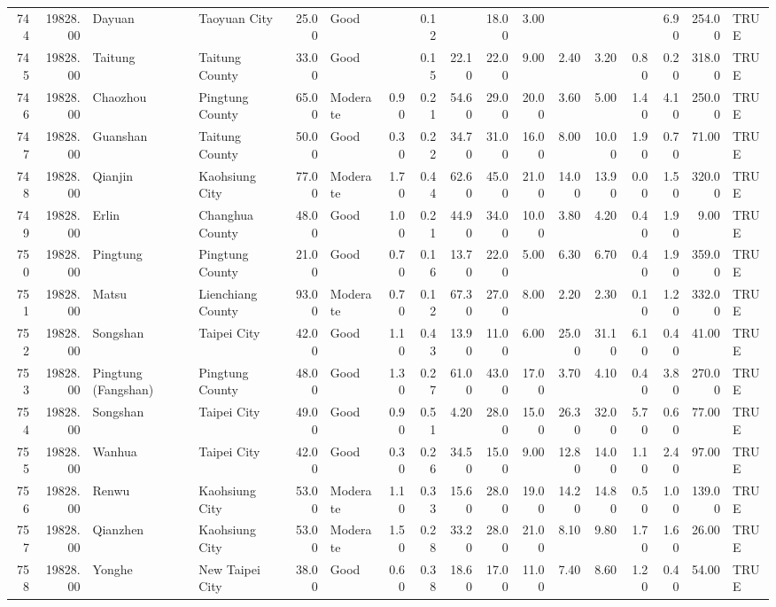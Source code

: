 \begin{table}[ht]
\begin{tabular}{rrllrlrrrrrrrrrrl}
  744 & 19828.00 & Dayuan & Taoyuan City & 25.00 & Good &  & 0.12 &  & 18.00 & 3.00 &  &  &  & 6.90 & 254.00 & TRUE \\ 
  745 & 19828.00 & Taitung & Taitung County & 33.00 & Good &  & 0.15 & 22.10 & 22.00 & 9.00 & 2.40 & 3.20 & 0.80 & 0.20 & 318.00 & TRUE \\ 
  746 & 19828.00 & Chaozhou & Pingtung County & 65.00 & Moderate & 0.90 & 0.21 & 54.60 & 29.00 & 20.00 & 3.60 & 5.00 & 1.40 & 4.10 & 250.00 & TRUE \\ 
  747 & 19828.00 & Guanshan & Taitung County & 50.00 & Good & 0.30 & 0.22 & 34.70 & 31.00 & 16.00 & 8.00 & 10.00 & 1.90 & 0.70 & 71.00 & TRUE \\ 
  748 & 19828.00 & Qianjin & Kaohsiung City & 77.00 & Moderate & 1.70 & 0.44 & 62.60 & 45.00 & 21.00 & 14.00 & 13.90 & 0.00 & 1.50 & 320.00 & TRUE \\ 
  749 & 19828.00 & Erlin & Changhua County & 48.00 & Good & 1.00 & 0.21 & 44.90 & 34.00 & 10.00 & 3.80 & 4.20 & 0.40 & 1.90 & 9.00 & TRUE \\ 
  750 & 19828.00 & Pingtung & Pingtung County & 21.00 & Good & 0.70 & 0.16 & 13.70 & 22.00 & 5.00 & 6.30 & 6.70 & 0.40 & 1.90 & 359.00 & TRUE \\ 
  751 & 19828.00 & Matsu & Lienchiang County & 93.00 & Moderate & 0.70 & 0.12 & 67.30 & 27.00 & 8.00 & 2.20 & 2.30 & 0.10 & 1.20 & 332.00 & TRUE \\ 
  752 & 19828.00 & Songshan & Taipei City & 42.00 & Good & 1.10 & 0.43 & 13.90 & 11.00 & 6.00 & 25.00 & 31.10 & 6.10 & 0.40 & 41.00 & TRUE \\ 
  753 & 19828.00 & Pingtung (Fangshan) & Pingtung County & 48.00 & Good & 1.30 & 0.27 & 61.00 & 43.00 & 17.00 & 3.70 & 4.10 & 0.40 & 3.80 & 270.00 & TRUE \\ 
  754 & 19828.00 & Songshan & Taipei City & 49.00 & Good & 0.90 & 0.51 & 4.20 & 28.00 & 15.00 & 26.30 & 32.00 & 5.70 & 0.60 & 77.00 & TRUE \\ 
  755 & 19828.00 & Wanhua & Taipei City & 42.00 & Good & 0.30 & 0.26 & 34.50 & 15.00 & 9.00 & 12.80 & 14.00 & 1.10 & 2.40 & 97.00 & TRUE \\ 
  756 & 19828.00 & Renwu & Kaohsiung City & 53.00 & Moderate & 1.10 & 0.33 & 15.60 & 28.00 & 19.00 & 14.20 & 14.80 & 0.50 & 1.00 & 139.00 & TRUE \\ 
  757 & 19828.00 & Qianzhen & Kaohsiung City & 53.00 & Moderate & 1.50 & 0.28 & 33.20 & 28.00 & 21.00 & 8.10 & 9.80 & 1.70 & 1.60 & 26.00 & TRUE \\ 
  758 & 19828.00 & Yonghe & New Taipei City & 38.00 & Good & 0.60 & 0.38 & 18.60 & 17.00 & 11.00 & 7.40 & 8.60 & 1.20 & 0.40 & 54.00 & TRUE \\ 

\end{tabular}
\end{table}
